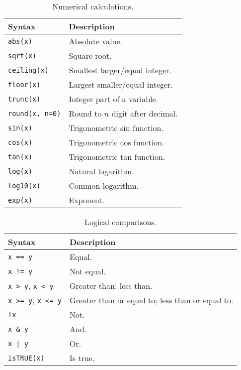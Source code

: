 \begin{table}
  \centering \caption{Numerical calculations.}\label{ch:r1:tab:numericalcalculation}
  \begin{tabularx}{\textwidth}{lX}
    \hline
    Syntax & Description \\ \hline
    \verb|abs(x)| & Absolute value. \\
    \verb|sqrt(x)| & Square root. \\
    \verb|ceiling(x)| & Smallest larger/equal integer. \\
    \verb|floor(x)| & Largest smaller/equal integer. \\
    \verb|trunc(x)| & Integer part of a variable. \\
    \verb|round(x, n=0)| & Round to $n$ digit after decimal. \\
    \verb|sin(x)| & Trigonometric sin function. \\
    \verb|cos(x)| & Trigonometric cos function. \\
    \verb|tan(x)| & Trigonometric tan function. \\
    \verb|log(x)| & Natural logarithm. \\
    \verb|log10(x)| & Common logarithm. \\
    \verb|exp(x)| & Exponent. \\
    \hline
  \end{tabularx}
\end{table}

\begin{table}
  \centering \caption{Logical comparisons.}\label{ch:r1:tab:logicalcomparison}
  \begin{tabularx}{\textwidth}{lX}
    \hline
    Syntax & Description \\ \hline
    \verb|x == y| & Equal. \\
    \verb|x != y| & Not equal. \\
    \verb|x > y|, \verb|x < y| & Greater than; less than. \\
    \verb|x >= y|, \verb|x <= y| & Greater than or equal to; less than or equal to. \\
    \verb|!x| & Not. \\
    \verb|x & y| & And. \\
    \verb$x | y$ & Or. \\
    \verb|isTRUE(x)| & Is true. \\
    \hline
  \end{tabularx}
\end{table}

